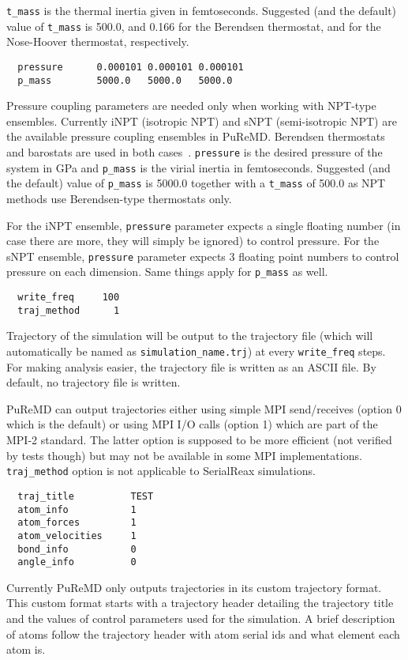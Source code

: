 \documentclass{article}
\begin{document}
{\tt t\_mass} is the thermal inertia given in femtoseconds. Suggested (and 
the default) value of {\tt t\_mass} is 500.0, and 0.166 for the Berendsen 
thermostat, and for the Nose-Hoover thermostat, respectively.

\begin{verbatim}
  pressure      0.000101 0.000101 0.000101
  p_mass        5000.0   5000.0   5000.0
\end{verbatim}
Pressure coupling parameters are needed only when working with NPT-type 
ensembles. Currently iNPT (isotropic NPT) and sNPT (semi-isotropic NPT) 
are the available pressure coupling ensembles in PuReMD. Berendsen 
thermostats and barostats are used in both cases~\cite{ref:berendsen}. 
{\tt pressure} is the desired pressure of the system in GPa and {\tt p\_mass}
is the virial inertia in femtoseconds. Suggested (and the default) value of
{\tt p\_mass} is 5000.0 together with a {\tt t\_mass} of 500.0 as NPT methods
use Berendsen-type thermostats only.

For the iNPT ensemble, {\tt pressure} parameter expects a single
floating number (in case there are more, they will simply be ignored) 
to control pressure. For the sNPT ensemble, {\tt pressure} parameter 
expects 3 floating point numbers to control pressure on each dimension.
Same things apply for {\tt p\_mass} as well.

\begin{verbatim}
  write_freq     100
  traj_method      1
\end{verbatim}
Trajectory of the simulation will be output to the trajectory file 
(which will automatically be named as {\tt simulation\_name.trj}) at 
every {\tt write\_freq} steps. For making analysis easier, the trajectory 
file is written as an ASCII file. By default, no trajectory file
is written.

PuReMD can output trajectories either using simple MPI send/receives 
(option 0 which is the default) or using MPI I/O calls (option 1) which 
are part of the MPI-2 standard. The latter option is supposed to be more 
efficient (not verified by tests though) but may not be available in some 
MPI implementations. {\tt traj\_method} option is not applicable to 
SerialReax simulations.

\begin{verbatim}
  traj_title          TEST
  atom_info           1
  atom_forces         1
  atom_velocities     1
  bond_info           0
  angle_info          0
\end{verbatim}
Currently PuReMD only outputs trajectories in its custom trajectory 
format. This custom format starts with a trajectory header detailing 
the trajectory title and the values of control parameters used for 
the simulation. A brief description of atoms follow the trajectory 
header with atom serial ids and what element each atom is.
\end{document}
